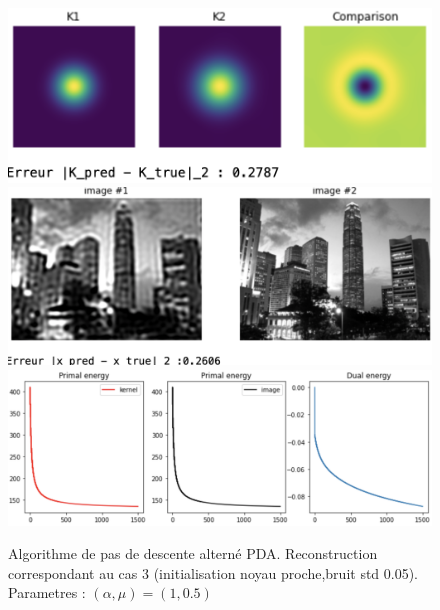 \documentclass[a4paper]{article}
\begin{document}
\begin{figure}[h]
\includegraphics[scale=0.8]{figures/algov-cas3-kernel}
\includegraphics[scale=0.6]{figures/algov-cas3-image}
\includegraphics[scale=0.6]{figures/algov-cas3-energy}
\caption{Algorithme de pas de descente alterné PDA. Reconstruction correspondant au cas 3  (initialisation noyau proche,bruit std 0.05). Parametres : $(\alpha,\mu) =(1,0.5)$}
\end{figure}

\end{document}
